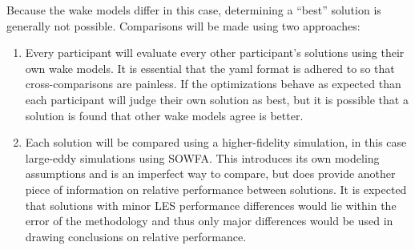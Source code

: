 \documentclass{article}
\begin{document}
Because the wake models differ in this case, determining a ``best'' solution is generally not possible.  Comparisons will be made using two approaches:
\begin{enumerate}
    \item Every participant will evaluate every other participant's solutions using their own wake models.  It is essential that the yaml format is adhered to so that cross-comparisons are painless.  If the optimizations behave as expected than each participant will judge their own solution as best, but it is possible that a solution is found that other wake models agree is better.
    \item Each solution will be compared using a higher-fidelity simulation, in this case large-eddy simulations using SOWFA.  This introduces its own modeling assumptions and is an imperfect way to compare, but does provide another piece of information on relative performance between solutions.  It is expected that solutions with minor LES performance differences would lie within the error of the methodology and thus only major differences would be used in drawing conclusions on relative performance.
\end{enumerate}




\end{document}
